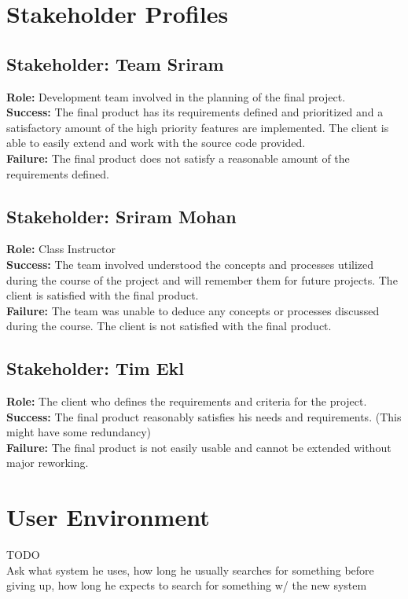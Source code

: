\documentclass{article}
\begin{document}
\section{Stakeholder Profiles}
\subsection{Stakeholder: Team Sriram}
\textbf{Role:} Development team involved in the planning of the final project.\\
\textbf{Success:} The final product has its requirements defined and prioritized and a satisfactory amount of the high priority features are implemented.  The client is able to easily extend and work with the source code provided.\\
\textbf{Failure:} The final product does not satisfy a reasonable amount of the requirements defined.

\subsection{Stakeholder: Sriram Mohan}
\textbf{Role:} Class Instructor\\
\textbf{Success:} The team involved understood the concepts and processes utilized during the course of the project and will remember them for future projects. The client is satisfied with the final product.\\
\textbf{Failure:} The team was unable to deduce any concepts or processes discussed during the course. The client is not satisfied with the final product.

\subsection{Stakeholder: Tim Ekl}
\textbf{Role:} The client who defines the requirements and criteria for the project.\\
\textbf{Success:} The final product reasonably satisfies his needs and requirements. (This might have some redundancy)\\
\textbf{Failure:} The final product is not easily usable and cannot be extended without major reworking.
\section{User Environment}
TODO\\
Ask what system he uses, how long he usually searches for something before giving up, how long he expects to search for something w/ the new system
\end{document}
